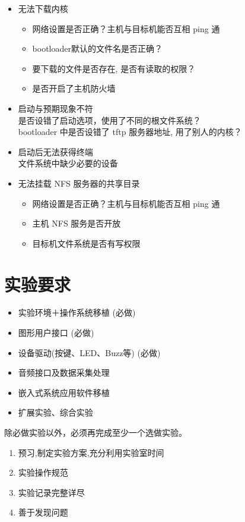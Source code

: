 \begin{itemize}
  \item 无法下载内核
  \begin{itemize}
	\item 网络设置是否正确？主机与目标机能否互相 ping 通
	\item bootloader默认的文件名是否正确？
	\item 要下载的文件是否存在, 是否有读取的权限？
	\item 是否开启了主机防火墙
\end{itemize}
\end{itemize}
\endslide

\begin{itemize}
  \item 启动与预期现象不符\\
		是否设错了启动选项，使用了不同的根文件系统？\\
		bootloader 中是否设错了 tftp 服务器地址, 用了别人的内核？
  \item 启动后无法获得终端\\
		文件系统中缺少必要的设备
  \item 无法挂载 NFS 服务器的共享目录
  \begin{itemize}
	\item 网络设置是否正确？主机与目标机能否互相 ping 通
	\item 主机 NFS 服务是否开放
	\item 目标机文件系统是否有写权限
  \end{itemize}
\end{itemize}
\endslide

\chapter{实验要求}{}
\begin{itemize}
  \item 实验环境＋操作系统移植 ({\red 必做})
  \item 图形用户接口 ({\red 必做})
  \item 设备驱动(按键、LED、Buzz等) ({\red 必做})
  \item 音频接口及数据采集处理
  \item 嵌入式系统应用软件移植
  \item 扩展实验、综合实验
\end{itemize}
除必做实验以外，必须再完成至少一个选做实验。
\endslide

\begin{enumerate}
  \item 预习,制定实验方案,充分利用实验室时间
  \item 实验操作规范
  \item 实验记录完整详尽
  \item 善于发现问题
\end{enumerate}
\endslide


